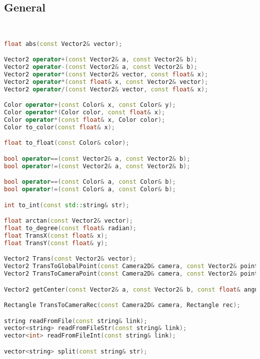 \subsection{General}
\begin{lstlisting}[language=C++]


float abs(const Vector2& vector);

Vector2 operator+(const Vector2& a, const Vector2& b);
Vector2 operator-(const Vector2& a, const Vector2& b);
Vector2 operator*(const Vector2& vector, const float& x);
Vector2 operator*(const float& x, const Vector2& vector);
Vector2 operator/(const Vector2& vector, const float& x);

Color operator+(const Color& x, const Color& y);
Color operator*(Color color, const float& x);
Color operator*(const float& x, Color color);
Color to_color(const float& x);

float to_float(const Color& color);

bool operator==(const Vector2& a, const Vector2& b);
bool operator!=(const Vector2& a, const Vector2& b);

bool operator==(const Color& a, const Color& b);
bool operator!=(const Color& a, const Color& b);

int to_int(const std::string& str);

float arctan(const Vector2& vector);
float to_degree(const float& radian);
float TransX(const float& x);
float TransY(const float& y);

Vector2 Trans(const Vector2& vector);
Vector2 TransToGlobalPoint(const Camera2D& camera, const Vector2& point);
Vector2 TransToCameraPoint(const Camera2D& camera, const Vector2& point);

Vector2 getCenter(const Vector2& a, const Vector2& b, const float& angular);

Rectangle TransToCameraRec(const Camera2D& camera, Rectangle rec);

string readFromFile(const string& link);
vector<string> readFromFileStr(const string& link);
vector<int> readFromFileInt(const string& link);

vector<string> split(const string& str);






\end{lstlisting}
